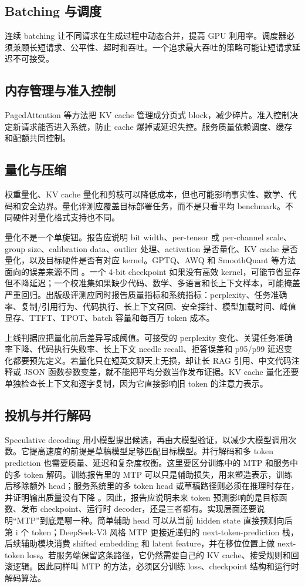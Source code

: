 \documentclass[UTF8,zihao=-4,openany]{ctexbook}
\begin{document}
\subsection{Batching 与调度}
连续 batching 让不同请求在生成过程中动态合并，提高 GPU 利用率。调度器必须兼顾长短请求、公平性、超时和吞吐。一个追求最大吞吐的策略可能让短请求延迟不可接受。

\subsection{内存管理与准入控制}
PagedAttention 等方法把 KV cache 管理成分页式 block，减少碎片。准入控制决定新请求能否进入系统，防止 cache 爆掉或延迟失控。服务质量依赖调度、缓存和配额共同控制。

\subsection{量化与压缩}
权重量化、KV cache 量化和剪枝可以降低成本，但也可能影响事实性、数学、代码和安全边界。量化评测应覆盖目标部署任务，而不是只看平均 benchmark。不同硬件对量化格式支持也不同。

量化不是一个单旋钮。报告应说明 bit width、per-tensor 或 per-channel scale、group size、calibration data、outlier 处理、activation 是否量化、KV cache 是否量化，以及目标硬件是否有对应 kernel。GPTQ、AWQ 和 SmoothQuant 等方法面向的误差来源不同 \cite{frantar2022gptq,lin2023awq,xiao2023smoothquant}。一个 4-bit checkpoint 如果没有高效 kernel，可能节省显存但不降延迟；一个校准集如果缺少代码、数学、多语言和长上下文样本，可能掩盖严重回归。出版级评测应同时报告质量指标和系统指标：perplexity、任务准确率、复制/引用行为、代码执行、长上下文召回、安全探针、模型加载时间、峰值显存、TTFT、TPOT、batch 容量和每百万 token 成本。

上线判据应把量化前后差异写成阈值。可接受的 perplexity 变化、关键任务准确率下降、代码执行失败率、长上下文 needle recall、拒答误差和 p95/p99 延迟变化都要预先定义。若量化只在短英文聊天上无损，却让长 RAG 引用、中文代码注释或 JSON 函数参数变差，就不能把平均分数当作发布证据。KV cache 量化还要单独检查长上下文和逐字复制，因为它直接影响旧 token 的注意力表示。

\subsection{投机与并行解码}
Speculative decoding 用小模型提出候选，再由大模型验证，以减少大模型调用次数。它提高速度的前提是草稿模型足够匹配目标模型。并行解码和多 token prediction 也需要质量、延迟和复杂度权衡。这里要区分训练中的 MTP 和服务中的多 token 解码。训练报告里的 MTP 可以只是辅助损失，用来塑造表示，训练后移除额外 head；服务系统里的多 token head 或草稿路径则必须在推理时存在，并证明输出质量没有下降 \cite{deepseek2024v3}。因此，报告应说明未来 token 预测影响的是目标函数、发布 checkpoint、运行时 decoder，还是三者都有。实现层面还要说明“MTP”到底是哪一种。简单辅助 head 可以从当前 hidden state 直接预测向后第 i 个 token；DeepSeek-V3 风格 MTP 更接近递归的 next-token-prediction 栈，后续辅助模块消费 shifted embedding 和 latent feature，并在移位位置上做 next-token loss。若服务端保留这条路径，它仍然需要自己的 KV cache、接受规则和回滚逻辑。因此同样叫 MTP 的方法，必须区分训练 loss、checkpoint 结构和运行时解码算法。
\end{document}
